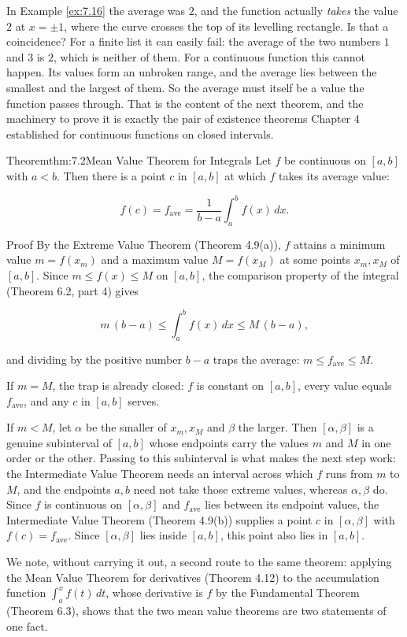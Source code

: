 \documentclass[a4paper,12pt,oneside]{memoir}
\begin{document}
In Example \ref{ex:7.16} the average was \(2\), and the function actually \emph{takes} the value \(2\) at \(x = \pm 1\), where the curve crosses the top of its levelling rectangle. Is that a coincidence? For a finite list it can easily fail: the average of the two numbers \(1\) and \(3\) is \(2\), which is neither of them. For a continuous function this cannot happen. Its values form an unbroken range, and the average lies between the smallest and the largest of them. So the average must itself be a value the function passes through. That is the content of the next theorem, and the machinery to prove it is exactly the pair of existence theorems Chapter 4 established for continuous functions on closed intervals.

\begin{envtheorem}{Theorem}{thm:7.2}{Mean Value Theorem for Integrals}
Let \(f\) be continuous on \([a, b]\) with \(a < b\). Then there is a point \(c\) in \([a, b]\) at which \(f\) takes its average value:

\[ f(c) = f_{\text{ave}} = \frac{1}{b - a}\int_{a}^{b} f(x)\,dx. \]
\end{envtheorem}
\begin{envproof}{Proof}{}{}
By the Extreme Value Theorem (Theorem 4.9(a)), \(f\) attains a minimum value \(m = f(x_m)\) and a maximum value \(M = f(x_M)\) at some points \(x_m, x_M\) of \([a, b]\). Since \(m \le f(x) \le M\) on \([a, b]\), the comparison property of the integral (Theorem 6.2, part 4) gives

\[ m\,(b - a) \le \int_{a}^{b} f(x)\,dx \le M\,(b - a), \]

and dividing by the positive number \(b - a\) traps the average: \(m \le f_{\text{ave}} \le M\).

If \(m = M\), the trap is already closed: \(f\) is constant on \([a, b]\), every value equals \(f_{\text{ave}}\), and any \(c\) in \([a, b]\) serves.

If \(m < M\), let \(\alpha\) be the smaller of \(x_m, x_M\) and \(\beta\) the larger. Then \([\alpha, \beta]\) is a genuine subinterval of \([a, b]\) whose endpoints carry the values \(m\) and \(M\) in one order or the other. Passing to this subinterval is what makes the next step work: the Intermediate Value Theorem needs an interval across which \(f\) runs from \(m\) to \(M\), and the endpoints \(a, b\) need not take those extreme values, whereas \(\alpha, \beta\) do. Since \(f\) is continuous on \([\alpha, \beta]\) and \(f_{\text{ave}}\) lies between its endpoint values, the Intermediate Value Theorem (Theorem 4.9(b)) supplies a point \(c\) in \([\alpha, \beta]\) with \(f(c) = f_{\text{ave}}\). Since \([\alpha, \beta]\) lies inside \([a, b]\), this point also lies in \([a, b]\). \qedmark
\end{envproof}
We note, without carrying it out, a second route to the same theorem: applying the Mean Value Theorem for derivatives (Theorem 4.12) to the accumulation function \(\int_{a}^{x} f(t)\,dt\), whose derivative is \(f\) by the Fundamental Theorem (Theorem 6.3), shows that the two mean value theorems are two statements of one fact.
\end{document}
